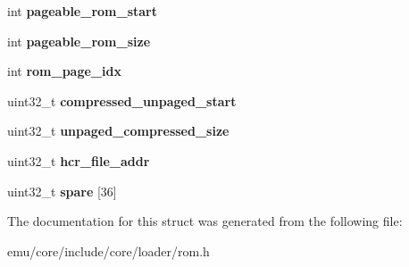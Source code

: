 \begin{DoxyCompactItemize}
int {\bfseries pageable\+\_\+rom\+\_\+start}
\item 
\mbox{\label{structeka2l1_1_1loader_1_1rom__header_ab93a95765519feae5f61ae0decf31aaf}} 
int {\bfseries pageable\+\_\+rom\+\_\+size}
\item 
\mbox{\label{structeka2l1_1_1loader_1_1rom__header_ac82573bca44d1ddf22daa297d529e2c9}} 
int {\bfseries rom\+\_\+page\+\_\+idx}
\item 
\mbox{\label{structeka2l1_1_1loader_1_1rom__header_aa34f07826272860b5e46faeb73757b7d}} 
uint32\+\_\+t {\bfseries compressed\+\_\+unpaged\+\_\+start}
\item 
\mbox{\label{structeka2l1_1_1loader_1_1rom__header_a8539ccfe8554108521b3700f118b5e93}} 
uint32\+\_\+t {\bfseries unpaged\+\_\+compressed\+\_\+size}
\item 
\mbox{\label{structeka2l1_1_1loader_1_1rom__header_a65b1161dec33a79bbb8a42b1821a5fef}} 
uint32\+\_\+t {\bfseries hcr\+\_\+file\+\_\+addr}
\item 
\mbox{\label{structeka2l1_1_1loader_1_1rom__header_ac4fb2627718821549c980690789f7247}} 
uint32\+\_\+t {\bfseries spare} \mbox{[}36\mbox{]}
\end{DoxyCompactItemize}


The documentation for this struct was generated from the following file\+:\begin{DoxyCompactItemize}
\item 
emu/core/include/core/loader/rom.\+h\end{DoxyCompactItemize}

